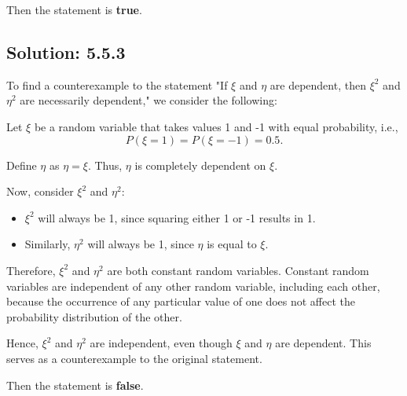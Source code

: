 Then the statement is \textbf{true}.

\subsection*{Solution: 5.5.3}

To find a counterexample to the statement "If $\xi$ and $\eta$ are dependent, then $\xi^2$ and $\eta^2$ are necessarily dependent," we consider the following:

Let $\xi$ be a random variable that takes values 1 and -1 with equal probability, i.e.,
\[ P(\xi = 1) = P(\xi = -1) = 0.5. \]

Define $\eta$ as $\eta = \xi$. Thus, $\eta$ is completely dependent on $\xi$.

Now, consider $\xi^2$ and $\eta^2$:
\begin{itemize}
    \item $\xi^2$ will always be 1, since squaring either 1 or -1 results in 1.
    \item Similarly, $\eta^2$ will always be 1, since $\eta$ is equal to $\xi$.
\end{itemize}

Therefore, $\xi^2$ and $\eta^2$ are both constant random variables. Constant random variables are independent of any other random variable, including each other, because the occurrence of any particular value of one does not affect the probability distribution of the other.

Hence, $\xi^2$ and $\eta^2$ are independent, even though $\xi$ and $\eta$ are dependent. This serves as a counterexample to the original statement.

Then the statement is \textbf{false}.